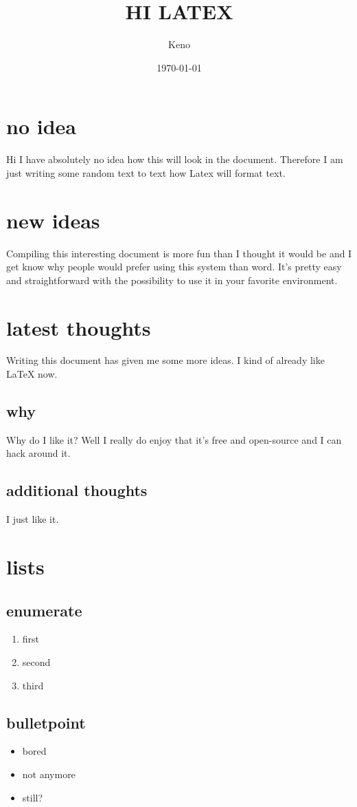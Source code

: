 \documentclass[12pt,a4paper,twocolumn]{article}
\title{HI LATEX}
\author{Keno}
\date{\today}
\begin{document}
\maketitle
\section{no idea}
Hi I have absolutely no idea how this will look in the document.
Therefore I am just writing some random text to text how Latex will format
text.
\section{new ideas}
Compiling this interesting document is more fun than I thought it would be and I get know why people would prefer using this system than word. It's pretty easy and straightforward with the possibility to use it in your
favorite environment.
\section{latest thoughts}
Writing this document has given me some more ideas. I kind of already like LaTeX now.
\subsection{why}
Why do I like it?
Well I really do enjoy that it's free and open-source and I can hack around it.
\subsection{additional thoughts}
I just like it.
\section{lists}
\subsection{enumerate}
\begin{enumerate}
	\item first
	\item second
	\item third
\end{enumerate}
\subsection{bulletpoint}
\begin{itemize}
	\item bored
	\item not anymore
	\item still?
\end{itemize}
\end{document}
